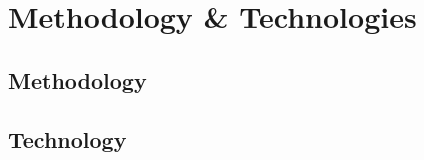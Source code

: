\chapter{Methodology \& Technologies\label{chap:technology}}

\section{Methodology}

\section{Technology}